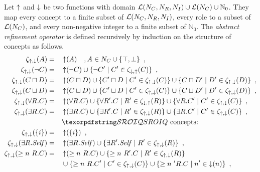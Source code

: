 \begin{definition}
Let $\mathop{\uparrow}$ and $\mathop{\downarrow}$ be two functions with domain $\mathcal{L}(N_C, N_R, N_I) \cup \mathcal{L}(N_C) \cup \mathbb{N}_0$. They map every concept to a finite subset of $\mathcal{L}(N_C, N_R, N_I)$, every role to a subset of $\mathcal{L}(N_C)$, and every non-negative integer to a finite subset of $\mathbb{N}_0$.
The \emph{abstract refinement operator} is defined recursively by induction on the structure of concepts as follows.
\begin{alignat*}{2}
    \zeta_{\refine,\corefine}(A) &= &&\refine(A) \quad, A \in N_C \cup \{\top, \bot\} \enspace, \\
    \zeta_{\refine,\corefine}(\lnot C) &= &&\refine(\lnot C) \cup \{ \lnot C' \mid C' \in \zeta_{\corefine,\refine}(C) \} \enspace, \\
    \zeta_{\refine,\corefine}(C \sqcap D) &= &&\refine(C \sqcap D) \cup \{ C' \sqcap D \mid C' \in \zeta_{\refine,\corefine}(C) \}
    \cup \{ C \sqcap D' \mid D' \in \zeta_{\refine,\corefine}(D) \} \enspace, \\
    \zeta_{\refine,\corefine}(C \sqcup D) &= &&\refine(C \sqcup D) \cup \{ C' \sqcup D \mid C' \in \zeta_{\refine,\corefine}(C) \}
    \cup \{ C \sqcup D' \mid D' \in \zeta_{\refine,\corefine}(D) \} \enspace, \\
    \zeta_{\refine,\corefine}(\forall R.C) &= &&\refine(\forall R.C) \cup \{ \forall R'.C \mid R' \in \zeta_{\corefine,\refine}(R) \} 
    \cup \{ \forall R.C' \mid C' \in \zeta_{\refine,\corefine}(C) \} \enspace, \\
    \zeta_{\refine,\corefine}(\exists R.C) &= &&\refine(\exists R.C) \cup \{ \exists R'.C \mid R' \in \zeta_{\refine,\corefine}(R) \}
    \cup \{ \exists R.C' \mid C' \in \zeta_{\refine,\corefine}(C) \} \enspace, \\
    &&& \text{\SROIQ concepts:} \\
    \zeta_{\refine,\corefine}(\nominal i) &= &&\refine(\nominal i) \enspace, \\
    \zeta_{\refine,\corefine}(\exists R.\self) &= &&\refine(\exists R.\self) \cup \{ \exists R'.\self \mid R' \in \zeta_{\refine,\corefine}(R) \} \enspace, \\
    \zeta_{\refine,\corefine}(\more n R.C) &= &&\refine(\more n R.C) \cup \{ \more n R'.C \mid R' \in \zeta_{\refine,\corefine}(R) \} \\
    &&& \cup \{ \more n R.C' \mid C' \in \zeta_{\refine,\corefine}(C) \}
    \cup \{ \more n' R.C \mid n' \in \corefine(n) \} \enspace, \\

\end{alignat*}
\end{definition}
